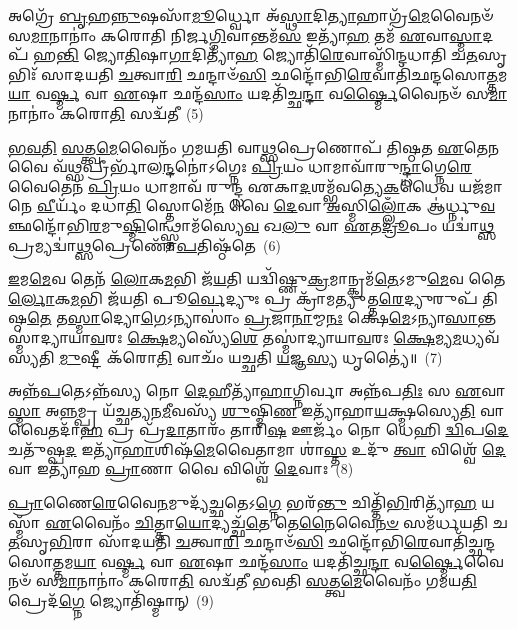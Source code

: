 𑌅𑌗𑍍𑌰𑍇᳴ \ul{𑌬𑍃}\-𑌹\-\ul{𑌨𑍍𑌨𑍁}\-𑌷𑌸𑌾᳴\-\ul{𑌮𑍂}\-𑌰𑍍𑌧𑍍𑌵𑍋 𑌅᳴\-\ul{𑌸𑍍𑌥𑌾}\-𑌦𑌿\-\ul{𑌤𑍍𑌯𑌾}\-𑌹𑌾𑌗𑍍𑌰᳴\-\ul{𑌮𑍇}\-𑌵𑍈𑌨𑍞᳴ 𑌸\-\ul{𑌮𑌾}\-𑌨𑌾𑌨𑌾𑌂॑ 𑌕𑌰𑍋𑌤𑌿 𑌨𑌿𑌰𑍍𑌜\-\ul{𑌗𑍍𑌮𑌿}\-𑌵𑌾𑌨𑍍𑌤𑌮᳴\-\ul{𑌸} 𑌇𑌤𑍍𑌯𑌾᳴\-\ul{𑌹} 𑌤𑌮᳴ \ul{𑌏}\-𑌵𑌾\-\ul{𑌸𑍍𑌮𑌾}\-𑌦𑌪᳴ 𑌹\-\ul{𑌨𑍍𑌤𑌿} 𑌜𑍍𑌯𑍋\-\ul{𑌤𑌿}\-𑌷𑌾\-\ul{𑌗𑌾}\-𑌦𑌿𑌤𑍍𑌯𑌾᳴\-\ul{𑌹} 𑌜𑍍𑌯𑍋𑌤𑌿᳴\-\ul{𑌰𑍇}\-𑌵𑌾𑌸𑍍𑌮𑌿᳴𑌨𑍍𑌦𑌧𑌾𑌤𑌿 𑌚\-\ul{𑌤}\-𑌸𑍃𑌭𑌿𑌃᳴ 𑌸𑌾𑌦𑌯𑌤𑌿 \ul{𑌚}\-𑌤𑍍𑌵𑌾\-\ul{𑌰𑌿} 𑌛𑌨𑍍𑌦𑌾𑍞᳴\-\ul{𑌸𑌿} 𑌛𑌨𑍍𑌦𑍋᳴𑌭𑌿\-\ul{𑌰𑍇}\-𑌵𑌾𑌤𑌿᳴𑌛𑌨𑍍𑌦𑌸𑍋\-\ul{𑌤𑍍𑌤}\-𑌮\-\ul{𑌯𑌾} 𑌵\-\ul{𑌰𑍍𑌷𑍍𑌮} 𑌵𑌾 \ul{𑌏}\-𑌷𑌾 𑌛𑌨𑍍𑌦᳴\-\ul{𑌸𑌾𑌂} 𑌯𑌦𑌤𑌿᳴𑌚𑍍𑌛\-\ul{𑌨𑍍𑌦𑌾} 𑌵\-\ul{𑌰𑍍𑌷𑍍𑌮𑍈}\-𑌵𑍈𑌨𑍞᳴ 𑌸\-\ul{𑌮𑌾}\-𑌨𑌾𑌨𑌾𑌂॑ 𑌕𑌰𑍋\-\ul{𑌤𑌿} 𑌸𑌦𑍍𑌵᳴𑌤𑍀~(5)

\-\ul{𑌭}\-\-\ul{𑌵}\-\-\ul{𑌤𑌿} \ul{𑌸}\-𑌤𑍍𑌤𑍍𑌵\-\ul{𑌮𑍇}\-𑌵𑍈𑌨𑌂᳴ 𑌗𑌮𑌯𑌤𑌿 𑌵𑌾\-\ul{𑌥𑍍𑌸}\-𑌪𑍍𑌰𑍇𑌣𑍋𑌪᳴ 𑌤𑌿𑌷𑍍𑌠𑌤 \ul{𑌏}\-𑌤𑍇\-\ul{𑌨} 𑌵𑍈 𑌵᳴\-\ul{𑌥𑍍𑌸}\-𑌪𑍍𑌰𑍀𑌰𑍍𑌭𑌾᳴𑌲\-\ul{𑌨𑍍𑌦}\-𑌨𑍋॑\-𑌽𑌗𑍍𑌨𑍇𑌃 \ul{𑌪𑍍𑌰𑌿}\-𑌯𑌂 𑌧𑌾𑌮𑌾𑌵𑌾᳴𑌰𑍁\-\ul{𑌨𑍍𑌦𑍍𑌧𑌾}\-𑌗𑍍𑌨𑍇\-\ul{𑌰𑍇}\-𑌵𑍈𑌤𑍇𑌨᳴ \ul{𑌪𑍍𑌰𑌿}\-𑌯𑌂 𑌧𑌾𑌮𑌾𑌵᳴ 𑌰𑍁𑌨𑍍𑌦𑍍𑌧 𑌏𑌕𑌾\-\ul{𑌦}\-𑌶𑌮𑍍𑌭᳴𑌵𑌤𑍍𑌯𑍇\-\ul{𑌕}\-𑌧𑍈𑌵 𑌯𑌜᳴𑌮𑌾𑌨𑍇 \ul{𑌵𑍀}\-𑌰𑍍𑌯𑌂᳴ 𑌦𑌧𑌾\-\ul{𑌤𑌿} 𑌸𑍍𑌤𑍋𑌮𑍇᳴\-\ul{𑌨} 𑌵𑍈 \ul{𑌦𑍇}\-𑌵𑌾 \ul{𑌅}\-𑌸𑍍𑌮𑌿\-\ul{𑌲𑍍𑌲𑍋𑌁}\-𑌕 𑌆॑𑌰𑍍𑌧𑍍𑌨𑍁\-\ul{𑌵}\-𑌞𑍍𑌛𑌨𑍍𑌦𑍋᳴𑌭𑌿\-\ul{𑌰}\-𑌮𑍁\-\ul{𑌷𑍍𑌮𑌿}\-𑌨𑍍𑌥𑍍𑌸𑍍𑌤𑍋𑌮᳴𑌸𑍍𑌯𑍇\-\ul{𑌵} 𑌖\-\ul{𑌲𑍁} 𑌵𑌾 \ul{𑌏}\-𑌤\-\ul{𑌦𑍍𑌰𑍂}\-𑌪𑌂 𑌯𑌦𑍍𑌵𑌾॑\-\ul{𑌥𑍍𑌸}\-𑌪𑍍𑌰𑌮𑍍𑌯𑌦𑍍𑌵𑌾॑\-\ul{𑌥𑍍𑌸}\-𑌪𑍍𑌰𑍇𑌣𑍋᳴\-\ul{𑌪}\-𑌤𑌿𑌷𑍍𑌠᳴𑌤𑍇~(6)

\-\ul{𑌇}\-𑌮\-\ul{𑌮𑍇}\-𑌵 𑌤𑍇𑌨᳴ \ul{𑌲𑍋}\-𑌕\-\ul{𑌮}\-𑌭𑌿 𑌜᳴\-\ul{𑌯}\-𑌤𑌿 𑌯𑌦𑍍𑌵𑌿᳴𑌷𑍍𑌣𑍁\-\ul{𑌕𑍍𑌰}\-𑌮𑌾𑌨𑍍𑌕𑍍𑌰𑌮᳴\-\ul{𑌤𑍇}\-\-𑌽𑌮𑍁\-\ul{𑌮𑍇}\-𑌵 𑌤𑍈\-\ul{𑌰𑍍𑌲𑍋}\-𑌕\-\ul{𑌮}\-𑌭𑌿 𑌜᳴𑌯𑌤𑌿 𑌪𑍂\-\ul{𑌰𑍍𑌵𑍇}\-𑌦𑍍𑌯𑍁𑌃 𑌪𑍍𑌰 𑌕𑍍𑌰𑌾᳴𑌮𑌤𑍍𑌯𑍁𑌤𑍍𑌤\-\ul{𑌰𑍇}\-𑌦𑍍𑌯𑍁𑌰𑍁𑌪᳴ 𑌤𑌿𑌷𑍍𑌠\-\ul{𑌤𑍇} 𑌤\-\ul{𑌸𑍍𑌮𑌾}\-𑌦𑍍𑌯𑍋\-\ul{𑌗𑍇}\-\-𑌽𑌨𑍍𑌯𑌾𑌸𑌾𑌂॑ \ul{𑌪𑍍𑌰}\-𑌜𑌾\-\ul{𑌨𑌾}\-𑌮𑍍𑌮\-\ul{𑌨𑌃} 𑌕𑍍𑌷𑍇\-\ul{𑌮𑍇}\-\-𑌽𑌨𑍍𑌯𑌾\-\ul{𑌸𑌾}\-𑌨𑍍𑌤𑌸𑍍𑌮𑌾॑𑌦𑍍𑌯𑌾𑌯𑌾\-\ul{𑌵}\-𑌰𑌃 \ul{𑌕𑍍𑌷𑍇}\-𑌮𑍍𑌯𑌸𑍍𑌯𑍇᳴\-\ul{𑌶𑍇} 𑌤𑌸𑍍𑌮𑌾॑𑌦𑍍𑌯𑌾𑌯𑌾\-\ul{𑌵}\-𑌰𑌃 \ul{𑌕𑍍𑌷𑍇}\-𑌮𑍍𑌯\-\ul{𑌮}\-𑌧𑍍𑌯𑌵᳴𑌸𑍍𑌯𑌤𑌿 \ul{𑌮𑍁}\-𑌷𑍍𑌟𑍀 𑌕᳴𑌰𑍋\-\ul{𑌤𑌿} 𑌵𑌾𑌚𑌂᳴ 𑌯𑌚𑍍𑌛𑌤𑌿 \ul{𑌯}\-𑌜𑍍𑌞\-\ul{𑌸𑍍𑌯} 𑌧𑍃𑌤𑍍𑌯𑍈॑॥~(7)

{\anuvakamend[{\-\ul{𑌸𑍃}\-𑌷𑍍𑌟𑍋\-𑌽𑌭𑍍𑌯𑍇᳴𑌤𑌯𑌾᳴ 𑌭𑌵\-\ul{𑌤𑌿} 𑌸𑌦𑍍𑌵᳴𑌤𑍍𑌯𑍁\-\ul{𑌪}\-𑌤𑌿𑌷𑍍𑌠᳴\-\ul{𑌤𑍇} 𑌦𑍍𑌵𑌿𑌚᳴𑌤𑍍𑌵𑌾𑌰𑌿𑍞𑌶𑌚𑍍𑌚}]}%

𑌅𑌨𑍍𑌨᳴\-\ul{𑌪}\-𑌤𑍇\-𑌽𑌨𑍍𑌨᳴𑌸𑍍𑌯 𑌨𑍋 \ul{𑌦𑍇}\-𑌹𑍀𑌤𑍍𑌯𑌾᳴\-\ul{𑌹𑌾}\-𑌗𑍍𑌨𑌿𑌰𑍍𑌵𑌾 𑌅𑌨𑍍𑌨᳴𑌪\-\ul{𑌤𑌿𑌃} 𑌸 \ul{𑌏}\-𑌵𑌾\-\ul{𑌸𑍍𑌮𑌾} 𑌅\-\ul{𑌨𑍍𑌨}\-𑌮𑍍𑌪𑍍𑌰 𑌯᳴𑌚𑍍𑌛𑌤𑍍𑌯𑌨\-\ul{𑌮𑍀}\-𑌵𑌸𑍍𑌯᳴ \ul{𑌶𑍁}\-𑌷𑍍𑌮𑌿\-\ul{𑌣} 𑌇𑌤𑍍𑌯𑌾᳴𑌹𑌾\-\ul{𑌯}\-𑌕𑍍𑌷𑍍𑌮𑌸𑍍𑌯𑍇\-\ul{𑌤𑌿} 𑌵𑌾𑌵𑍈𑌤𑌦𑌾᳴\-\ul{𑌹} 𑌪𑍍𑌰 𑌪𑍍𑌰᳴\-\ul{𑌦𑌾}\-𑌤𑌾𑌰𑌂᳴ 𑌤𑌾𑌰𑌿\-\ul{𑌷} 𑌊𑌰𑍍𑌜𑌂᳴ 𑌨𑍋 𑌧𑍇𑌹𑌿 \ul{𑌦𑍍𑌵𑌿}\-𑌪\-\ul{𑌦𑍇} 𑌚𑌤𑍁᳴𑌷𑍍𑌪\-\ul{𑌦} 𑌇𑌤𑍍𑌯𑌾᳴\-\ul{𑌹𑌾}\-𑌶𑌿𑌷᳴\-\ul{𑌮𑍇}\-𑌵𑍈𑌤𑌾𑌮𑌾 𑌶𑌾॑\-\ul{𑌸𑍍𑌤} 𑌉𑌦𑍁᳴ \ul{𑌤𑍍𑌵𑌾} 𑌵𑌿𑌶𑍍𑌵𑍇᳴ \ul{𑌦𑍇}\-𑌵𑌾 𑌇𑌤𑍍𑌯𑌾᳴𑌹 \ul{𑌪𑍍𑌰𑌾}\-𑌣𑌾 𑌵𑍈 𑌵𑌿𑌶𑍍𑌵𑍇᳴ \ul{𑌦𑍇}\-𑌵𑌾𑌃~(8)

\-\ul{𑌪𑍍𑌰𑌾}\-𑌣𑍈\-\ul{𑌰𑍇}\-𑌵𑍈\-\ul{𑌨}\-𑌮𑍁𑌦𑍍𑌯᳴\-\ul{𑌚𑍍𑌛}\-𑌤𑍇\-𑌽\-\ul{𑌗𑍍𑌨𑍇} 𑌭𑌰᳴\-\ul{𑌨𑍍𑌤𑍁} 𑌚𑌿𑌤𑍍𑌤𑌿᳴\-\ul{𑌭𑌿}\-𑌰𑌿𑌤𑍍𑌯𑌾᳴\-\ul{𑌹} 𑌯𑌸𑍍𑌮𑌾᳴ \ul{𑌏}\-𑌵𑍈𑌨𑌂᳴ \ul{𑌚𑌿}\-𑌤𑍍𑌤𑌾\-\ul{𑌯𑍋}\-𑌦𑍍𑌯𑌚𑍍𑌛᳴\-\ul{𑌤𑍇} 𑌤𑍇\-\ul{𑌨𑍈}\-𑌵𑍈\-\ul{𑌨}\-\-\ul{𑍞} 𑌸𑌮᳴𑌰𑍍𑌧𑌯𑌤𑌿 𑌚\-\ul{𑌤}\-𑌸𑍃\-\ul{𑌭𑌿}\-𑌰𑌾 𑌸𑌾᳴𑌦𑌯𑌤𑌿 \ul{𑌚}\-𑌤𑍍𑌵𑌾\-\ul{𑌰𑌿} 𑌛𑌨𑍍𑌦𑌾𑍞᳴\-\ul{𑌸𑌿} 𑌛𑌨𑍍𑌦𑍋᳴𑌭𑌿\-\ul{𑌰𑍇}\-𑌵𑌾𑌤𑌿᳴𑌚𑍍𑌛𑌨𑍍𑌦𑌸𑍋\-\ul{𑌤𑍍𑌤}\-𑌮\-\ul{𑌯𑌾} 𑌵\-\ul{𑌰𑍍𑌷𑍍𑌮} 𑌵𑌾 \ul{𑌏}\-𑌷𑌾 𑌛𑌨𑍍𑌦᳴\-\ul{𑌸𑌾𑌂} 𑌯𑌦𑌤𑌿᳴𑌚𑍍𑌛\-\ul{𑌨𑍍𑌦𑌾} 𑌵\-\ul{𑌰𑍍𑌷𑍍𑌮𑍈}\-𑌵𑍈𑌨𑍞᳴ 𑌸\-\ul{𑌮𑌾}\-𑌨𑌾𑌨𑌾𑌂॑ 𑌕𑌰𑍋\-\ul{𑌤𑌿} 𑌸𑌦𑍍𑌵᳴𑌤𑍀 𑌭𑌵𑌤𑌿 \ul{𑌸}\-𑌤𑍍𑌤𑍍𑌵\-\ul{𑌮𑍇}\-𑌵𑍈𑌨𑌂᳴ 𑌗𑌮𑌯\-\ul{𑌤𑌿} 𑌪𑍍𑌰𑍇𑌦᳴\-\ul{𑌗𑍍𑌨𑍇} 𑌜𑍍𑌯𑍋𑌤𑌿᳴𑌷𑍍𑌮𑌾𑌨𑍍~(9)

